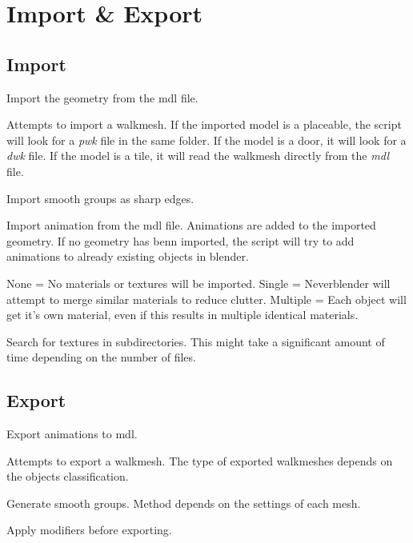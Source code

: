 \chapter{Import \& Export}

\section{Import}

\begin{description}[leftmargin=13em,style=nextline]
    \item[Import Geometry] Import the geometry from the mdl file.
    \item[Import Walkmesh] Attempts to import a walkmesh. If the imported model is a placeable, the script will look for a {\textit{pwk}} file in the same folder. If the model is a door, it will look for a {\textit{dwk}} file. If the model is a tile, it will read the walkmesh directly from the {\textit{mdl}} file.
    \item[Import Smooth Groups] Import smooth groups as sharp edges.
    \item[Import Animations] Import animation from the mdl file. Animations are added to the imported geometry. If no geometry has benn imported, the script will try to add animations to already existing objects in blender.
    \item[Materials] None = No materials or textures will be imported. Single = Neverblender will attempt to merge similar materials to reduce clutter. Multiple = Each object will get it's own material, even if this results in multiple identical materials.
    \item[Image Search] Search for textures in subdirectories. This might take a significant amount of time depending on the number of files.
\end{description}

\section{Export}

\begin{description}[leftmargin=12em,style=nextline]
    \item[Export Animations] Export animations to mdl.
    \item[Export Walkmesh] Attempts to export a walkmesh. The type of exported walkmeshes depends on the objects classification.
    \item[Export Smooth Groups] Generate smooth groups. Method depends on the settings of each mesh.
    \item[Apply Modifiers] Apply modifiers before exporting.
\end{description}

